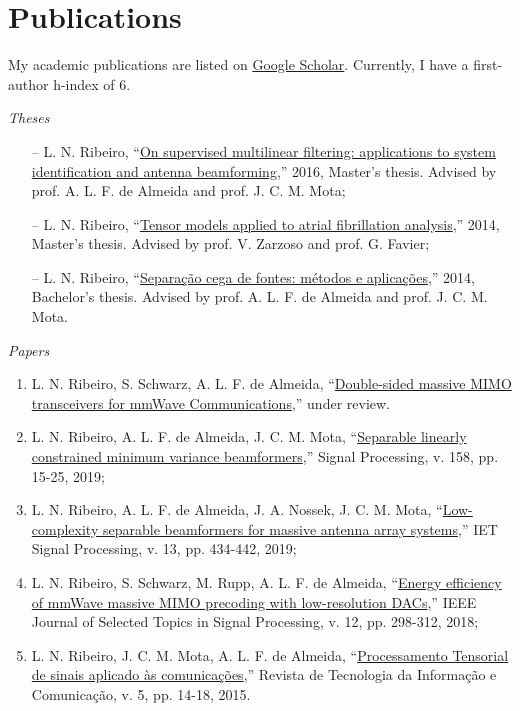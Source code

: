 \section{Publications}

My academic publications are listed on  \href{https://scholar.google.com.br/citations?user=STk6opQAAAAJ}{Google Scholar}. Currently, I have a first-author h-index of $6$.

{\sl Theses}

\begin{itemize}
	\item[--] L. N. Ribeiro, ``\href{http://www.repositorio.ufc.br/bitstream/riufc/16516/1/2016_dis_lnribeiro.pdf}{On supervised multilinear filtering: applications to system identification and antenna beamforming},'' 2016, Master's thesis. Advised by prof. A. L. F. de Almeida and prof. J. C. M. Mota;
	\item[--] L. N. Ribeiro, ``\href{https://github.com/lnribeiro/lnribeiro.github.io/blob/master/assets/pdf/rapport.pdf}{Tensor models applied to atrial fibrillation analysis},'' 2014, Master's thesis. Advised by prof. V. Zarzoso and prof. G. Favier;
	\item[--] L. N. Ribeiro, ``\href{https://github.com/lnribeiro/lnribeiro.github.io/blob/master/assets/pdf/monografia.pdf}{Separação cega de fontes: métodos e aplicações},'' 2014, Bachelor's thesis. Advised by prof. A. L. F. de Almeida and prof. J. C. M. Mota.
\end{itemize}

{\sl Papers}

\begin{enumerate}
	\item L. N. Ribeiro, S. Schwarz, A. L. F. de Almeida, ``\href{https://arxiv.org/abs/1907.08750}{Double-sided massive MIMO transceivers for mmWave Communications},'' under review. 
	
	\item L. N. Ribeiro, A. L. F. de Almeida, J. C. M. Mota, ``\href{https://doi.org/10.1016/j.sigpro.2018.12.010}{Separable linearly constrained minimum variance beamformers},'' Signal Processing, v. 158, pp. 15-25, 2019;
	
	\item L. N. Ribeiro, A. L. F. de Almeida, J. A. Nossek, J. C. M. Mota, ``\href{https://doi.org/10.1049/iet-spr.2018.5115}{Low-complexity separable beamformers for massive antenna array systems},'' IET Signal Processing, v. 13, pp. 434-442, 2019;
	
	\item L. N. Ribeiro, S. Schwarz, M. Rupp, A. L. F. de Almeida, ``\href{https://doi.org/10.1109/JSTSP.2018.2824762}{Energy efficiency of mmWave massive MIMO precoding with low-resolution DACs},'' IEEE Journal of Selected Topics in Signal Processing, v. 12, pp. 298-312, 2018;
	
	\item L. N. Ribeiro, J. C. M. Mota, A. L. F. de Almeida, ``\href{http://rtic.com.br/index.php/rtic/article/view/65}{Processamento Tensorial de sinais aplicado às comunicações},'' Revista de Tecnologia da Informação e Comunicação, v. 5, pp. 14-18, 2015.
\end{enumerate}

